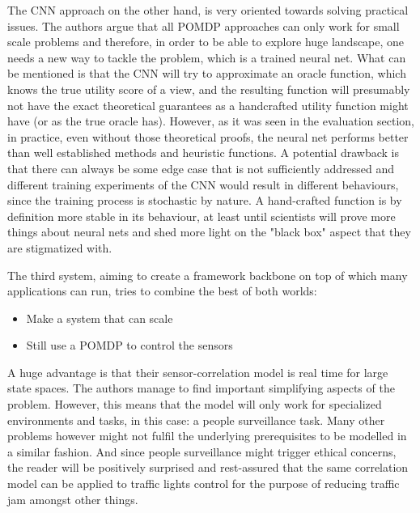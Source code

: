 \documentclass[a4paper,11pt,english]{article}
\begin{document}
The CNN approach on the other hand, is very oriented towards solving practical issues. The authors argue that all POMDP approaches can only work for small scale problems and therefore, in order to be able to explore huge landscape, one needs a new way to tackle the problem, which is a trained neural net. What can be mentioned is that the CNN will try to approximate an oracle function, which knows the true utility score of a view, and the resulting function will presumably not have the exact theoretical guarantees as a handcrafted utility function might have (or as the true oracle has). However, as it was seen in the evaluation section, in practice, even without those theoretical proofs, the neural net performs better than well established methods and heuristic functions. A potential drawback is that there can always be some edge case that is not sufficiently addressed and different training experiments of the CNN would result in different behaviours, since the training process is stochastic by nature. A hand-crafted function is by definition more stable in its behaviour, at least until scientists will prove more things about neural nets and shed more light on the "black box" aspect that they are stigmatized with.

The third system, aiming to create a framework backbone on top of which many applications can run, tries to combine the best of both worlds:
\begin{itemize}
\item Make a system that can scale
\item Still use a POMDP to control the sensors
\end{itemize}

A huge advantage is that their sensor-correlation model is real time for large state spaces. The authors manage to find important simplifying aspects of the problem. However, this means that the model will only work for specialized environments and tasks, in this case: a people surveillance task. Many other problems however might not fulfil the underlying prerequisites to be modelled in a similar fashion. And since people surveillance might trigger ethical concerns, the reader will be positively surprised and rest-assured that the same correlation model can be applied to traffic lights control for the purpose of reducing traffic jam amongst other things.
\end{document}
